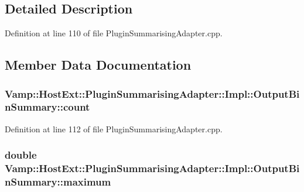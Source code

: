 \subsection{Detailed Description}


Definition at line 110 of file Plugin\+Summarising\+Adapter.\+cpp.



\subsection{Member Data Documentation}
\subsubsection[{\texorpdfstring{count}{count}}]{ Vamp\+::\+Host\+Ext\+::\+Plugin\+Summarising\+Adapter\+::\+Impl\+::\+Output\+Bin\+Summary\+::count}\hypertarget{struct_vamp_1_1_host_ext_1_1_plugin_summarising_adapter_1_1_impl_1_1_output_bin_summary_ad1bb60db34ce4e1df260100fa31d64b3}{}\label{struct_vamp_1_1_host_ext_1_1_plugin_summarising_adapter_1_1_impl_1_1_output_bin_summary_ad1bb60db34ce4e1df260100fa31d64b3}


Definition at line 112 of file Plugin\+Summarising\+Adapter.\+cpp.

\subsubsection[{\texorpdfstring{maximum}{maximum}}]{\setlength{\rightskip}{0pt plus 5cm}double Vamp\+::\+Host\+Ext\+::\+Plugin\+Summarising\+Adapter\+::\+Impl\+::\+Output\+Bin\+Summary\+::maximum}\hypertarget{struct_vamp_1_1_host_ext_1_1_plugin_summarising_adapter_1_1_impl_1_1_output_bin_summary_adb07c2cf5cd017e84f91f2898eee96b5}{}\label{struct_vamp_1_1_host_ext_1_1_plugin_summarising_adapter_1_1_impl_1_1_output_bin_summary_adb07c2cf5cd017e84f91f2898eee96b5}


